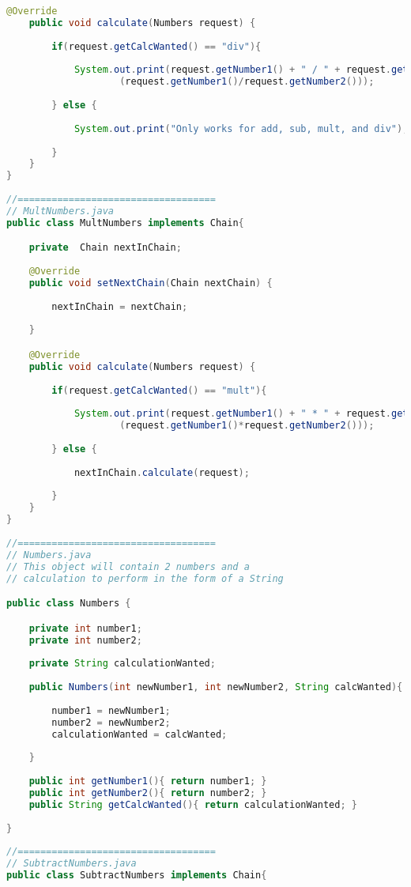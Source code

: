 \documentclass[10pt , a4paper]{article}
\begin{document}
\begin{lstlisting}[language=java]
	@Override
	public void calculate(Numbers request) {
		
		if(request.getCalcWanted() == "div"){
			
			System.out.print(request.getNumber1() + " / " + request.getNumber2() + " = "+
					(request.getNumber1()/request.getNumber2()));
			
		} else {
			
			System.out.print("Only works for add, sub, mult, and div");
			
		}
	}
}
 
//===================================
// MultNumbers.java
public class MultNumbers implements Chain{

	private  Chain nextInChain;
	
	@Override
	public void setNextChain(Chain nextChain) {
		
		nextInChain = nextChain;
		
	}

	@Override
	public void calculate(Numbers request) {
		
		if(request.getCalcWanted() == "mult"){
			
			System.out.print(request.getNumber1() + " * " + request.getNumber2() + " = "+
					(request.getNumber1()*request.getNumber2()));
			
		} else {
			
			nextInChain.calculate(request);
			
		}	
	}
}
 
//===================================
// Numbers.java
// This object will contain 2 numbers and a
// calculation to perform in the form of a String

public class Numbers {

	private int number1;
	private int number2;
	
	private String calculationWanted;
	
	public Numbers(int newNumber1, int newNumber2, String calcWanted){
		
		number1 = newNumber1;
		number2 = newNumber2;
		calculationWanted = calcWanted;
		
	}
	
	public int getNumber1(){ return number1; }
	public int getNumber2(){ return number2; }
	public String getCalcWanted(){ return calculationWanted; }
	
}
 
//===================================
// SubtractNumbers.java
public class SubtractNumbers implements Chain{


\end{lstlisting}
\end{document}
